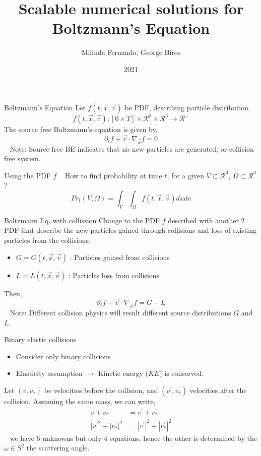 \documentclass{beamer}
\title{Scalable numerical solutions for Boltzmann's Equation}
\author{Milinda Fernando, George Biros}
\institute{Oden Institute, University of Texas at Austin }
\date{2021}
\begin{document}
\frame{\titlepage}

\begin{frame}{Boltzmann's Equation}
    Let $f(t,\vec{x}, \vec{v})$ be PDF, describing particle distribution. 
    \begin{equation}
        f(t,\vec{x}, \vec{v}) : [0\times T] \times \mathcal{R}^3 \times \mathcal{R}^3 \rightarrow \mathcal{R}^{+}
    \end{equation}
The source free Boltzmann's equation is given by, 
\begin{equation}
    \partial_t f + \vec{v} \cdot \nabla_{\vec{x}} f = 0
\end{equation}
\textbullet~ Note: Source free BE indicates that no new particles are generated, or collision free system. 
\end{frame}

\begin{frame}{Using the PDF $f$}
    \textbullet~ How to find probability at time $t$, for a given $V\subset \mathcal{R}^3$, $\Omega \subset \mathcal{R}^3$ ? 
    \begin{equation}
        Pr_t(V,\Omega) = \int_{V} \int_{\Omega} f(t,\vec{x},\vec{v}) dx dv
    \end{equation}   
\end{frame}

\begin{frame}{Boltzmann Eq. with collission}
    Change to the PDF $f$ described with another 2 PDF that describe the new particles gained through collisions and loss of existing particles from the collisions. 
    \begin{itemize}
        \item $G=G(t,\vec{x},\vec{v})$ : Particles gained from collisions
        \item $L=L(t,\vec{x},\vec{v})$ : Particles loss from collisions
    \end{itemize}
Then, 
\begin{equation}
    \partial_t f + \vec{v} \cdot \nabla_{\vec{x}} f = G-L
\end{equation}
\textbullet~ Note: Different collision physics will result different source distributions $G$ and $L$.
\end{frame}

\begin{frame}{Binary elastic collisions}
    \begin{itemize}
        \item Consider only binary collisions
        \item Elasticity assumption $\rightarrow$ Kinetic energy ($KE$) is conserved. 
    \end{itemize}
    Let $(v,v_*)$ be velocities before the collision, and $(v^\prime, v_{*}^\prime)$ velocities after the collision. Assuming the same mass, we can write, 
    \begin{align}
        v + v_* &= v^\prime + v_{*}^\prime \\
        |v|^2  + |v_*|^2 &= |v^\prime|^2  + |v_{*}^\prime|^2
    \end{align}
    \textbullet~ we have 6 unknowns but only 4 equations, hence the other is determined by the $\omega \in S^2$ the scattering angle. 
\end{frame}
\end{document}
